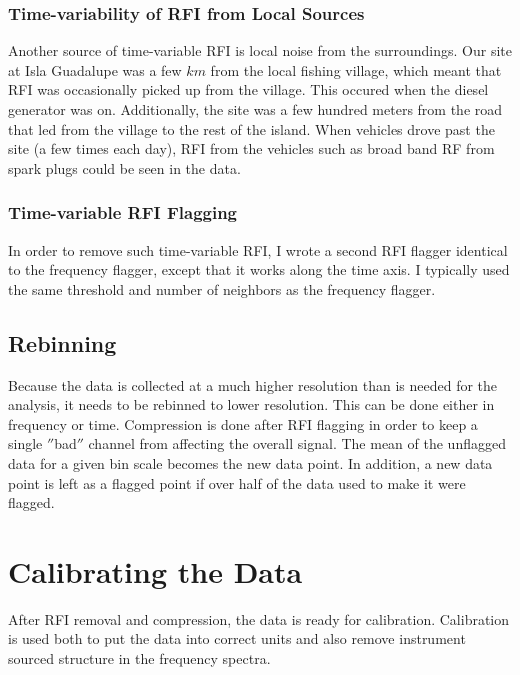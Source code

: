 \subsubsection{Time-variability of RFI from Local Sources}

Another source of time-variable RFI is local noise from the surroundings. Our site at Isla Guadalupe was a few $km$ from the local fishing village, which meant that RFI was occasionally picked up from the village. This occured when the diesel generator was on. Additionally, the site was a few hundred meters from the road that led from the village to the rest of the island. When vehicles drove past the site (a few times each day), RFI from the vehicles such as broad band RF from spark plugs could be seen in the data. 

\subsubsection{Time-variable RFI Flagging}

In order to remove such time-variable RFI, I wrote a second RFI flagger identical to the frequency flagger, except that it works along the time axis. I typically used the same threshold and number of neighbors as the frequency flagger. 


\subsection{Rebinning}

Because the data is collected at a much higher resolution than is needed for the analysis, it needs to be rebinned to lower resolution. This can be done either in frequency or time. Compression is done after RFI flagging in order to keep a single $''$bad$''$ channel from affecting the overall signal. The mean of the unflagged data for a given bin scale becomes the new data point. In addition, a new data point is left as a flagged point if over half of the data used to make it were flagged. 



\section{Calibrating the Data}

After RFI removal and compression, the data is ready for calibration. Calibration is used both to put the data into correct units and also remove instrument sourced structure in the frequency spectra. 


